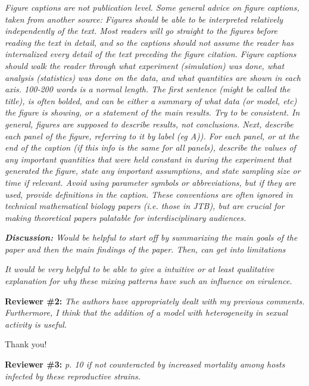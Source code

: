 \documentclass[10pt]{letter}
\newcommand{\revcomment}[1]{\emph{#1}}
\newcommand{\response}[1]{#1}
\begin{document}
\begin{letter}{
}
\revcomment{
Figure captions are not publication level. Some general advice on figure captions, taken from another source: Figures should be able to be interpreted relatively independently of the text. Most readers will go straight to the figures before reading the text in detail, and so the captions should not assume the reader has internalized every detail of the text preceding the figure citation. Figure captions should walk the reader through what experiment (simulation) was done, what analysis (statistics) was done on the data, and what quantities are shown in each axis. 100-200 words is a normal length. The first sentence (might be called the title), is often bolded, and can be either a summary of what data (or model, etc) the figure is showing, or a statement of the main results. Try to be consistent. In general, figures are supposed to describe results, not conclusions. Next, describe each panel of the figure, referring to it by label (eg A)). For each panel, or at the end of the caption (if this info is the same for all panels), describe the values of any important quantities that were held constant in during the experiment that generated the figure, state any important assumptions, and state sampling size or time if relevant. Avoid using parameter symbols or abbreviations, but if they are used, provide definitions in the caption. These conventions are often ignored in technical mathematical biology papers (i.e. those in JTB), but are crucial for making theoretical papers palatable for interdisciplinary audiences.
}

\response{

}

\revcomment{
\textbf{Discussion:}
Would be helpful to start off by summarizing the main goals of the paper and then the main findings of the paper. Then, can get into limitations
}

\revcomment{
It would be very helpful to be able to give a intuitive or at least qualitative explanation for why these mixing patterns have such an influence on virulence.
}

\textbf{Reviewer \#2:}
\revcomment{
 The authors have appropriately dealt with my previous comments. Furthermore, I think that the addition of a model with heterogeneity in sexual activity is useful.
}

\response{
Thank you!
}

\textbf{Reviewer \#3:}
\revcomment{
p. 10 if not counteracted by increased mortality among hosts infected by these reproductive strains.
}


\end{letter}
\end{document}
